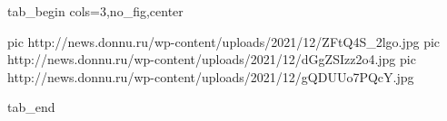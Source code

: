  
 
 
 
 


\ifcmt
  tab_begin cols=3,no_fig,center

     pic http://news.donnu.ru/wp-content/uploads/2021/12/ZFtQ4S_2lgo.jpg
		 pic http://news.donnu.ru/wp-content/uploads/2021/12/dGgZSIzz2o4.jpg
		 pic http://news.donnu.ru/wp-content/uploads/2021/12/gQDUUo7PQcY.jpg

  tab_end
\fi
